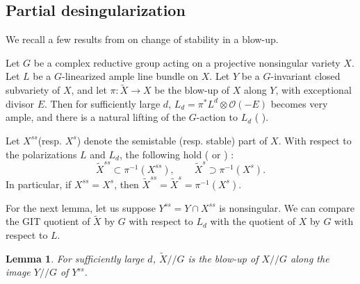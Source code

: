 \documentclass[10pt]{amsart}
\newtheorem{lemma}[theorem]{Lemma}
\theoremstyle{definition}
\newcommand{\cO}{\mathcal{O} }
\def\git{/\!/ }
\begin{document}
\subsection{Partial desingularization}\label{sec2.2}
We recall a few results from \cite{Kirwan, Hu} on change of
stability in a blow-up.

Let $G$ be a complex reductive group acting on a projective
nonsingular variety $X$. Let $L$ be a $G$-linearized ample line
bundle on $X$. Let $Y$ be a $G$-invariant closed subvariety of
$X$, and let $\pi : \widetilde{X} \to X$ be the blow-up of $X$
along $Y$, with exceptional divisor $E$. Then for sufficiently
large $d$, $L_d = \pi^*L^d \otimes \cO(-E)$ becomes very ample,
and there is a natural lifting of the $G$-action to $L_d$ (
\cite[\S3]{Kirwan}).

Let $X^{ss}$(resp. $X^s$) denote the semistable (resp. stable)
part of $X$. With respect to the polarizations $L$ and $L_d$, the
following hold (\cite[\S3]{Kirwan} or \cite[Theorem 3.11]{Hu})
:\begin{equation}\label{eq-StabBlowup} \widetilde{X}^{ss} \subset
\pi^{-1}(X^{ss}), \qquad \widetilde{X}^{s} \supset
\pi^{-1}(X^{s}).\end{equation} In particular, if $X^{ss} = X^s$,
then $\widetilde{X}^{ss} = \widetilde{X}^s = \pi^{-1}(X^s)$.

For the next lemma, let us suppose $Y^{ss}=Y\cap X^{ss}$ is
nonsingular. We can compare the GIT quotient of $\widetilde{X}$ by
$G$ with respect to $L_d$ with the quotient of $X$ by $G$ with
respect to $L$.
\begin{lemma}\cite[Lemma 3.11]{Kirwan} \label{blowupGIT}
For sufficiently large $d$, $\widetilde{X}\git G$ is the blow-up
of $X\git G$ along the image $Y \git G$ of $Y^{ss}$.
\end{lemma}
\end{document}
